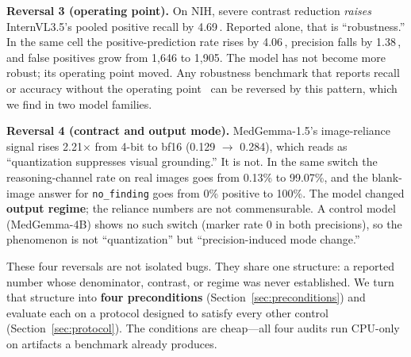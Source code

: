 \textbf{Reversal 3 (operating point).} On NIH, severe contrast reduction \emph{raises} InternVL3.5's pooled positive recall by 4.69\,\pp{}. Reported alone, that is ``robustness.'' In the same cell the positive-prediction rate rises by 4.06\,\pp{}, precision falls by 1.38\,\pp{}, and false positives grow from 1,646 to 1,905. The model has not become more robust; its operating point moved. Any robustness benchmark that reports recall or accuracy without the operating point~\citep{imam2025corruption,yang2026stress} can be reversed by this pattern, which we find in two model families.

\textbf{Reversal 4 (contract and output mode).} MedGemma-1.5's image-reliance signal rises 2.21$\times$ from 4-bit to bf16 (0.129 $\rightarrow$ 0.284), which reads as ``quantization suppresses visual grounding.'' It is not. In the same switch the reasoning-channel rate on real images goes from 0.13\% to 99.07\%, and the blank-image answer for \texttt{no\_finding} goes from 0\% positive to 100\%. The model changed \textbf{output regime}; the reliance numbers are not commensurable. A control model (MedGemma-4B) shows no such switch (marker rate 0 in both precisions), so the phenomenon is not ``quantization'' but ``precision-induced mode change.''

These four reversals are not isolated bugs. They share one structure: a reported number whose denominator, contrast, or regime was never established. We turn that structure into \textbf{four preconditions} (Section~\ref{sec:preconditions}) and evaluate each on a protocol designed to satisfy every other control (Section~\ref{sec:protocol}). The conditions are cheap---all four audits run CPU-only on artifacts a benchmark already produces.


